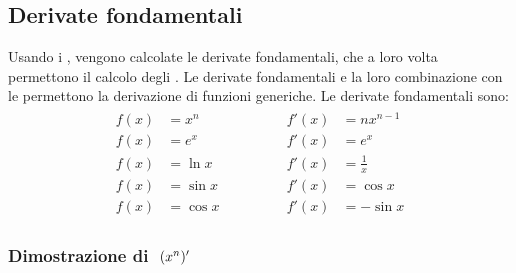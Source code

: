 \documentclass[letterpaper,10pt,english]{jupyterBook}
\begin{document}
\subsection{Derivate fondamentali}
\label{\detokenize{ch/infinitesimal_calculus/derivatives:derivate-fondamentali}}\label{\detokenize{ch/infinitesimal_calculus/derivatives:infinitesimal-calculus-derivatives-fund}}
\sphinxAtStartPar
Usando i {\hyperref[\detokenize{ch/infinitesimal_calculus/limits:infinitesimal-calculus-limits-fund}]{}}, vengono calcolate le derivate fondamentali, che a loro volta permettono il calcolo degli {\hyperref[\detokenize{ch/infinitesimal_calculus/integrals:infinitesimal-calculus-integrals-fund}]{}}. Le derivate fondamentali e la loro combinazione con le {\hyperref[\detokenize{ch/infinitesimal_calculus/derivatives:infinitesimal-calculus-derivatives-rules}]{}} permettono la derivazione di funzioni generiche. Le derivate fondamentali sono:
\begin{equation}\label{equation:ch/infinitesimal_calculus/derivatives:eq:infinitesimal-calculus:derivatives:fund}
\begin{split}\begin{aligned}
f(x) & = x^n    \qquad & \qquad f'(x) & = n x^{n-1}   \\ 
f(x) & = e^x    \qquad & \qquad f'(x) & = e^x         \\ 
f(x) & = \ln x  \qquad & \qquad f'(x) & = \frac{1}{x} \\ 
f(x) & = \sin x \qquad & \qquad f'(x) & = \cos x      \\ 
f(x) & = \cos x \qquad & \qquad f'(x) & =-\sin x         
\end{aligned}\end{split}
\end{equation}\subsubsection*{Dimostrazione di \protect\(\ (x^n)'\protect\)}
\end{document}
